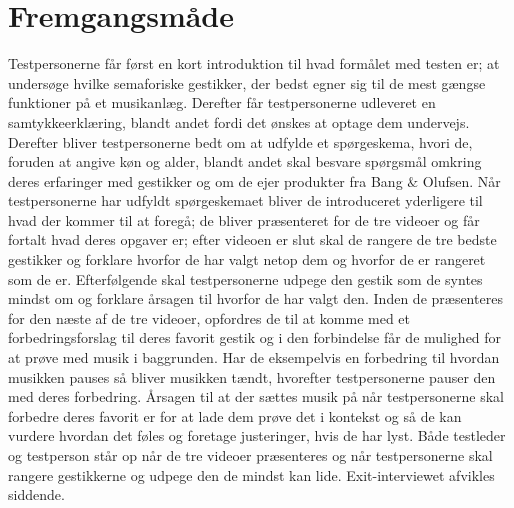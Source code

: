 \section{Fremgangsmåde}
\label{FremgangsmaadeValgAfGestikker}
%
Testpersonerne får først en kort introduktion til hvad formålet med testen er; at undersøge hvilke semaforiske gestikker, der bedst egner sig til de mest gængse funktioner på et musikanlæg. Derefter får testpersonerne udleveret en samtykkeerklæring, blandt andet fordi det ønskes at optage dem undervejs. Derefter bliver testpersonerne bedt om at udfylde et spørgeskema, hvori de, foruden at angive køn og alder, blandt andet skal besvare spørgsmål omkring deres erfaringer med gestikker og om de ejer produkter fra Bang $\&$ Olufsen. Når testpersonerne har udfyldt spørgeskemaet bliver de introduceret yderligere til hvad der kommer til at foregå; de bliver præsenteret for de tre videoer og får fortalt hvad deres opgaver er; efter videoen er slut skal de rangere de tre bedste gestikker og forklare hvorfor de har valgt netop dem og hvorfor de er rangeret som de er. Efterfølgende skal testpersonerne udpege den gestik som de syntes mindst om og forklare årsagen til hvorfor de har valgt den. Inden de præsenteres for den næste af de tre videoer, opfordres de til at komme med et forbedringsforslag til deres favorit gestik og i den forbindelse får de mulighed for at prøve med musik i baggrunden. Har de eksempelvis en forbedring til hvordan musikken pauses så bliver musikken tændt, hvorefter testpersonerne pauser den med deres forbedring. Årsagen til at der sættes musik på når testpersonerne skal forbedre deres favorit er for at lade dem prøve det i kontekst og så de kan vurdere hvordan det føles og foretage justeringer, hvis de har lyst. Både testleder og testperson står op når de tre videoer præsenteres og når testpersonerne skal rangere gestikkerne og udpege den de mindst kan lide. Exit-interviewet afvikles siddende.  

